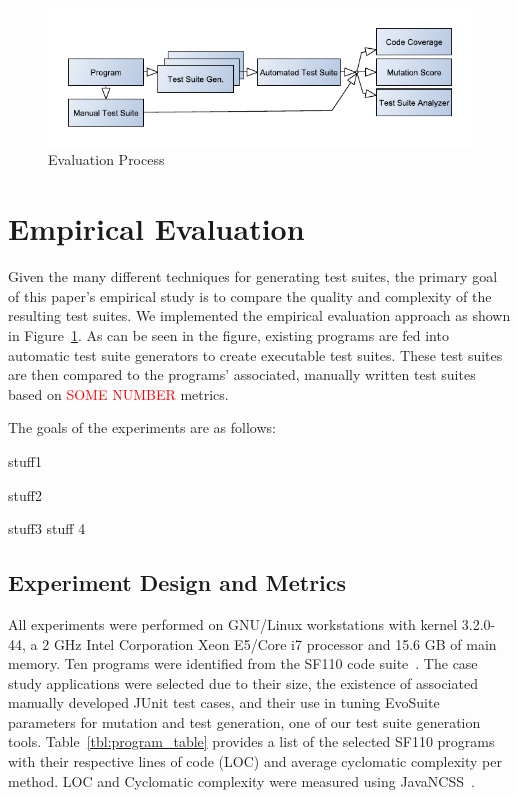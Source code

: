 
\begin{figure}[!t]
\centering
\captionsetup{justification=centering}
  \includegraphics[width=\linewidth]{proccess_diagram.pdf}
    \caption{Evaluation Process}
  \label{fig:process_diagram}
\end{figure}

\section{Empirical Evaluation}
\label{sec:evaluation}
Given the many different techniques for generating test suites, the primary goal of this paper's empirical study is to compare the quality and complexity of the resulting test suites.  We implemented the empirical evaluation approach as shown in Figure~\ref{fig:process_diagram}.  As can be seen in the figure, existing programs are fed into automatic test suite generators to create executable test suites.  These test suites are then compared to the programs' associated, manually written test suites based on \textcolor{red}{SOME NUMBER} metrics.   

The goals of the experiments are as follows:
\squishlist
\item stuff1
\item stuff2
\item stuff3
\tem stuff 4
\squishend

\subsection{Experiment Design and Metrics}
All experiments were performed on GNU/Linux workstations with kernel 3.2.0-44, a 2 GHz Intel Corporation Xeon E5/Core i7 processor and  15.6 GB of main memory. 
Ten programs were identified from the SF110 code suite~\cite{fraser:2012}.  The case study applications were selected due to their size, the existence of associated manually developed JUnit test cases, and their use in tuning EvoSuite parameters for mutation and test generation, one of our test suite generation tools.  Table~\ref{tbl:program_table} provides a list of the selected SF110 programs with their respective lines of code (LOC) and average cyclomatic complexity per method.  LOC and Cyclomatic complexity were measured using JavaNCSS~\cite{leejavancss}.  

